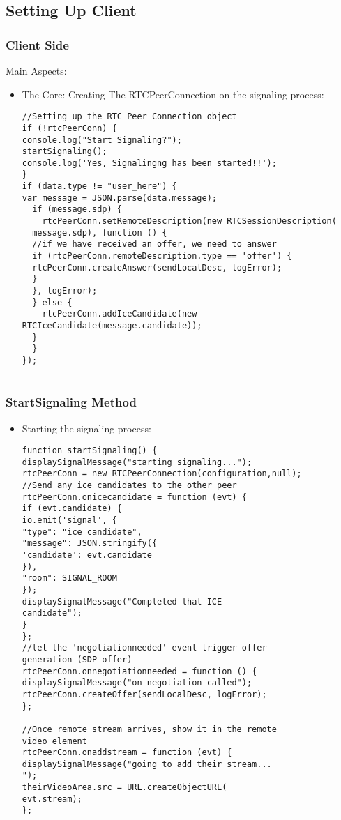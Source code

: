 \subsection{Setting Up Client}

\begin{frame}\frametitle{Client Side}
 Main Aspects:
\begin{itemize}
 \item The Core: Creating The RTCPeerConnection on the signaling process: %
 
 \begin{lstlisting}[style = JavaScript]
//Setting up the RTC Peer Connection object
if (!rtcPeerConn) {
console.log("Start Signaling?");
startSignaling();
console.log('Yes, Signalingng has been started!!');
}
if (data.type != "user_here") {
var message = JSON.parse(data.message);
  if (message.sdp) {
    rtcPeerConn.setRemoteDescription(new RTCSessionDescription(
  message.sdp), function () {
  //if we have received an offer, we need to answer
  if (rtcPeerConn.remoteDescription.type == 'offer') {
  rtcPeerConn.createAnswer(sendLocalDesc, logError);
  }
  }, logError);
  } else {
    rtcPeerConn.addIceCandidate(new RTCIceCandidate(message.candidate));
  }
  }
});
 
 \end{lstlisting}

\end{itemize}
\end{frame}

\begin{frame}\frametitle{StartSignaling Method}
\begin{itemize}
 \item Starting the signaling process: 
 
 \begin{lstlisting}[style = JavaScript]
function startSignaling() {
displaySignalMessage("starting signaling...");
rtcPeerConn = new RTCPeerConnection(configuration,null);
//Send any ice candidates to the other peer
rtcPeerConn.onicecandidate = function (evt) {
if (evt.candidate) {
io.emit('signal', {
"type": "ice candidate",
"message": JSON.stringify({
'candidate': evt.candidate
}),
"room": SIGNAL_ROOM
});
displaySignalMessage("Completed that ICE
candidate");
}
};
//let the 'negotiationneeded' event trigger offer
generation (SDP offer)
rtcPeerConn.onnegotiationneeded = function () {
displaySignalMessage("on negotiation called");
rtcPeerConn.createOffer(sendLocalDesc, logError);
};

//Once remote stream arrives, show it in the remote
video element
rtcPeerConn.onaddstream = function (evt) {
displaySignalMessage("going to add their stream...
");
theirVideoArea.src = URL.createObjectURL(
evt.stream);
};
  
 \end{lstlisting}

\end{itemize}
\end{frame}

